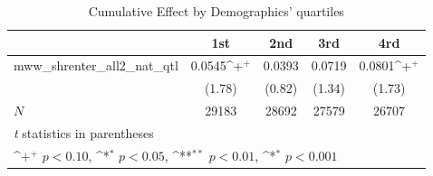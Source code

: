\begin{table}[htbp]\centering
\def\sym#1{\ifmmode^{#1}\else\(^{#1}\)\fi}
\caption{Cumulative Effect by Demographics' quartiles}
\begin{tabular}{l*{4}{c}}
\hline\hline
            &\multicolumn{1}{c}{1st}&\multicolumn{1}{c}{2nd}&\multicolumn{1}{c}{3rd}&\multicolumn{1}{c}{4rd}\\
\hline
mww\_shrenter\_all2\_nat\_qtl&      0.0545\sym{+}&      0.0393       &      0.0719       &      0.0801\sym{+}\\
            &      (1.78)       &      (0.82)       &      (1.34)       &      (1.73)       \\
\hline
\(N\)       &       29183       &       28692       &       27579       &       26707       \\
\hline\hline
\multicolumn{5}{l}{\footnotesize \textit{t} statistics in parentheses}\\
\multicolumn{5}{l}{\footnotesize \sym{+} \(p<0.10\), \sym{*} \(p<0.05\), \sym{**} \(p<0.01\), \sym{*} \(p<0.001\)}\\
\end{tabular}
\end{table}
